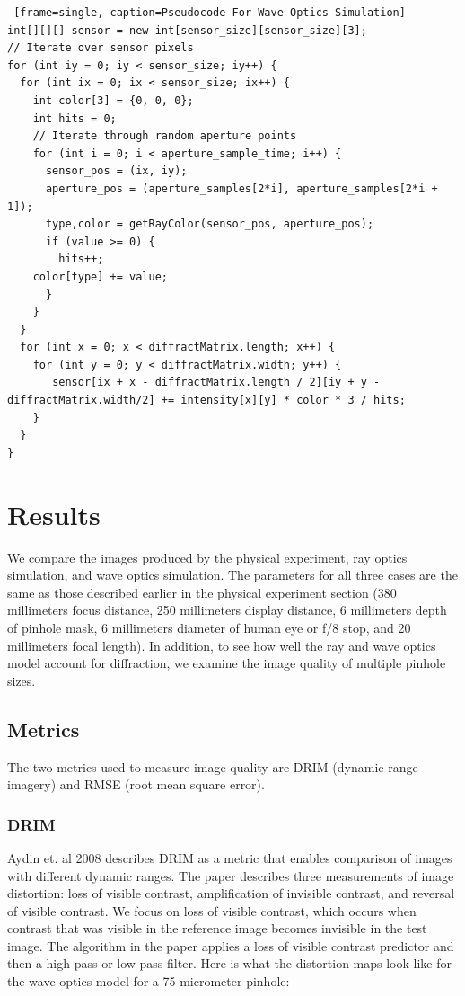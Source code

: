 \lstset {language=C++}
\begin{lstlisting} [frame=single, caption=Pseudocode For Wave Optics Simulation]
int[][][] sensor = new int[sensor_size][sensor_size][3];
// Iterate over sensor pixels
for (int iy = 0; iy < sensor_size; iy++) {
  for (int ix = 0; ix < sensor_size; ix++) {
    int color[3] = {0, 0, 0};
    int hits = 0;
    // Iterate through random aperture points
    for (int i = 0; i < aperture_sample_time; i++) {
      sensor_pos = (ix, iy);
      aperture_pos = (aperture_samples[2*i], aperture_samples[2*i + 1]);
      type,color = getRayColor(sensor_pos, aperture_pos);
      if (value >= 0) {
        hits++;
	color[type] += value;
      }
    }
  }
  for (int x = 0; x < diffractMatrix.length; x++) {
    for (int y = 0; y < diffractMatrix.width; y++) {
       sensor[ix + x - diffractMatrix.length / 2][iy + y - diffractMatrix.width/2] += intensity[x][y] * color * 3 / hits;
    }
  }
}
\end{lstlisting}

\section{Results}

We compare the images produced by the physical experiment, ray optics simulation, and wave optics simulation. The parameters for all three cases are the same as those described earlier in the physical experiment section (380 millimeters focus distance, 250 millimeters display distance, 6 millimeters depth of pinhole mask, 6 millimeters diameter of human eye or f/8 stop, and 20 millimeters focal length). In addition, to see how well the ray and wave optics model account for diffraction, we examine the image quality of multiple pinhole sizes.

\subsection{Metrics}

The two metrics used to measure image quality are DRIM (dynamic range imagery) and RMSE (root mean square error).

\subsubsection{DRIM}

Aydin et. al 2008 describes DRIM as a metric that enables comparison of images with different dynamic ranges. The paper describes three measurements of image distortion: loss of visible contrast, amplification of invisible contrast, and reversal of visible contrast. We focus on loss of visible contrast, which occurs when contrast that was visible in the reference image becomes invisible in the test image. The algorithm in the paper applies a loss of visible contrast predictor and then a high-pass or low-pass filter. Here is what the distortion maps look like for the wave optics model for a 75 micrometer pinhole:

